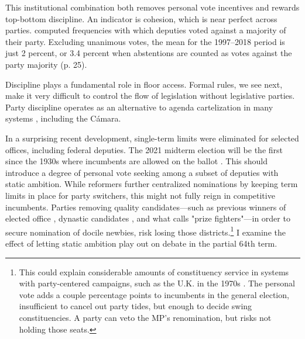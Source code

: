 \documentclass[letter,12pt]{article}
\begin{document}
This institutional combination both removes personal vote incentives \citep{carey.shugart.1995,cain.etal.1987} and rewards top-bottom discipline. An indicator is cohesion, which is near perfect across parties. \citet{tellez-del-rio.2018} computed frequencies with which deputies voted against a majority of their party. Excluding unanimous votes, the mean for the 1997--2018 period is just 2 percent, or 3.4 percent when abstentions are counted as votes against the party majority (p. 25). 

Discipline plays a fundamental role in floor access. Formal rules, we see next, make it very difficult to control the flow of legislation without legislative parties. Party discipline operates as an alternative to agenda cartelization in many systems \citep{prata.2006}, including the Cámara. 

In a surprising recent development, single-term limits were eliminated for selected offices, including federal deputies. The 2021 midterm election will be the first since the 1930s where incumbents are allowed on the ballot \citep[see][ for details]{magarInstReel.2017}. This should introduce a degree of personal vote seeking among a subset of deputies with static ambition. While reformers further centralized nominations by keeping term limits in place for party switchers, this might not fully reign in competitive incumbents. Parties removing quality candidates---such as previous winners of elected office \citep{jacobson.1997}, dynastic candidates \citep{enriquez-dinastias2018itam}, and what \citet{zallerprizeFighters} calls "prize fighters"---in order to secure nomination of docile newbies, risk losing those districts.\footnote{This could explain considerable amounts of constituency service in systems with party-centered campaigns, such as the U.K. in the 1970s \citep{cain.etal.1987}. The personal vote adds a couple percentage points to incumbents in the general election, insufficient to cancel out party tides, but enough to decide swing constituencies. A party can veto the MP's renomination, but risks not holding those seats.} I examine the effect of letting static ambition play out on debate in the partial 64th term. 

\end{document}
